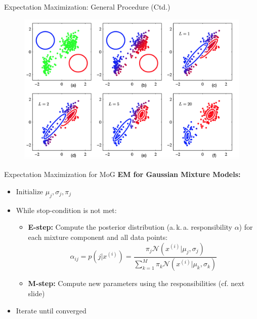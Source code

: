 \begin{frame}{Expectation Maximization: General Procedure (Ctd.)}{}
	\begin{figure}
		\includegraphics[scale=0.45]{04_density_estimation/02_img/em}
	\end{figure}
\end{frame}


\begin{frame}{Expectation Maximization for MoG}{}\important
	\vspace*{2mm}
	\textbf{EM for Gaussian Mixture Models:}
	\begin{itemize}
		\item Initialize $\mu_j, \sigma_j, \pi_j$
		\item While stop-condition is not met:
		\begin{itemize}
			\item \textbf{E-step:} Compute the posterior distribution (a.\,k.\,a. responsibility $\alpha$) for each mixture component and all data points:
			\begin{equation}
				\alpha_{ij} = p(j \vert x^{(i)}) = \frac{\pi_j \mathcal{N}(x^{(i)} \vert \mu_j, \sigma_j)}{\sum_{k=1}^M \pi_k \mathcal{N}(x^{(i)} \vert \mu_k, \sigma_k)}
			\end{equation}
			\item \textbf{M-step:} Compute new parameters using the responsibilities (cf. next slide)
		\end{itemize}
		\item Iterate until converged
	\end{itemize}
\end{frame}


